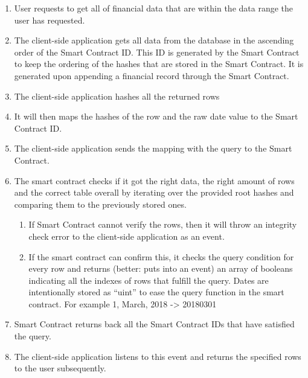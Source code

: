 \begin{enumerate}
\item User requests to get all of financial data that are within the data range the user has requested.
\item The client-side application gets all data from the database in the ascending order of the Smart Contract ID. This ID is generated by the Smart Contract to keep the ordering of the hashes that are stored in the Smart Contract. It is generated upon appending a financial record through the Smart Contract.
\item The client-side application hashes all the returned rows
\item It will then maps the hashes of the row and the raw date value to the Smart Contract ID.
\item The client-side application sends the mapping with the query to the Smart Contract.
\item The smart contract checks if it got the right data, the right amount of rows and the correct table overall by iterating over the provided root hashes and comparing them to the previously stored ones.
	\begin{enumerate}
	\item If Smart Contract cannot verify the rows, then it will throw an integrity check error to the client-side application as an event.
	\item If the smart contract can confirm this, it checks the query condition for every row and returns (better: puts into an event) an array of booleans indicating all the indexes of rows that fulfill the query. Dates are intentionally stored as “uint” to ease the query function in the smart contract. For example 1, March, 2018 -> 20180301
	\end{enumerate}
\item Smart Contract returns back all the Smart Contract IDs that have satisfied the query.
\item The client-side application listens to this event and returns the specified rows to the user subsequently.
\end{enumerate}
